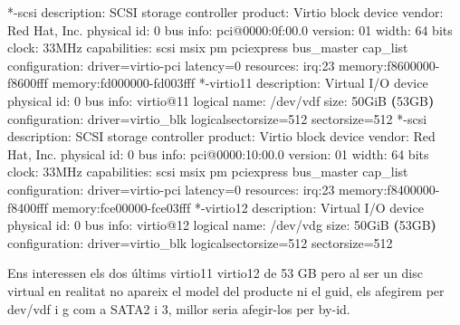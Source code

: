 \documentclass[
  10pt,
]{krantz}
\newenvironment{Shaded}{\begin{snugshade}}{\end{snugshade}}
\newcommand{\ErrorTok}[1]{\textcolor[rgb]{0.64,0.00,0.00}{\textbf{#1}}}
\newcommand{\ExtensionTok}[1]{#1}
\newcommand{\KeywordTok}[1]{\textcolor[rgb]{0.13,0.29,0.53}{\textbf{#1}}}
\newcommand{\NormalTok}[1]{#1}
\begin{document}
\begin{Shaded}
\begin{Highlighting}[]
  \ExtensionTok{*{-}scsi}
       \ExtensionTok{description:}\NormalTok{ SCSI storage controller}
       \ExtensionTok{product:}\NormalTok{ Virtio block device}
       \ExtensionTok{vendor:}\NormalTok{ Red Hat, Inc.}
       \ExtensionTok{physical}\NormalTok{ id: 0}
       \ExtensionTok{bus}\NormalTok{ info: pci@0000:0f:00.0}
       \ExtensionTok{version:}\NormalTok{ 01}
       \ExtensionTok{width:}\NormalTok{ 64 bits}
       \ExtensionTok{clock:}\NormalTok{ 33MHz}
       \ExtensionTok{capabilities:}\NormalTok{ scsi msix pm pciexpress bus\_master cap\_list}
       \ExtensionTok{configuration:}\NormalTok{ driver=virtio{-}pci latency=0}
       \ExtensionTok{resources:}\NormalTok{ irq:23 memory:f8600000{-}f8600fff memory:fd000000{-}fd003fff}
     \ExtensionTok{*{-}virtio11}
          \ExtensionTok{description:}\NormalTok{ Virtual I/O device}
          \ExtensionTok{physical}\NormalTok{ id: 0}
          \ExtensionTok{bus}\NormalTok{ info: virtio@11}
          \ExtensionTok{logical}\NormalTok{ name: /dev/vdf}
          \ExtensionTok{size:}\NormalTok{ 50GiB }\ErrorTok{(}\ExtensionTok{53GB}\KeywordTok{)}
          \ExtensionTok{configuration:}\NormalTok{ driver=virtio\_blk logicalsectorsize=512 sectorsize=512}
  \ExtensionTok{*{-}scsi}
       \ExtensionTok{description:}\NormalTok{ SCSI storage controller}
       \ExtensionTok{product:}\NormalTok{ Virtio block device}
       \ExtensionTok{vendor:}\NormalTok{ Red Hat, Inc.}
       \ExtensionTok{physical}\NormalTok{ id: 0}
       \ExtensionTok{bus}\NormalTok{ info: pci@0000:10:00.0}
       \ExtensionTok{version:}\NormalTok{ 01}
       \ExtensionTok{width:}\NormalTok{ 64 bits}
       \ExtensionTok{clock:}\NormalTok{ 33MHz}
       \ExtensionTok{capabilities:}\NormalTok{ scsi msix pm pciexpress bus\_master cap\_list}
       \ExtensionTok{configuration:}\NormalTok{ driver=virtio{-}pci latency=0}
       \ExtensionTok{resources:}\NormalTok{ irq:23 memory:f8400000{-}f8400fff memory:fce00000{-}fce03fff}
     \ExtensionTok{*{-}virtio12}
          \ExtensionTok{description:}\NormalTok{ Virtual I/O device}
          \ExtensionTok{physical}\NormalTok{ id: 0}
          \ExtensionTok{bus}\NormalTok{ info: virtio@12}
          \ExtensionTok{logical}\NormalTok{ name: /dev/vdg}
          \ExtensionTok{size:}\NormalTok{ 50GiB }\ErrorTok{(}\ExtensionTok{53GB}\KeywordTok{)}
          \ExtensionTok{configuration:}\NormalTok{ driver=virtio\_blk logicalsectorsize=512 sectorsize=512}
\end{Highlighting}
\end{Shaded}

Ens interessen els dos últims virtio11 virtio12 de 53 GB pero al ser un disc virtual en realitat no apareix el model del producte ni el guid, els afegirem per dev/vdf i g com a SATA2 i 3, millor seria afegir-los per by-id.
\end{document}
